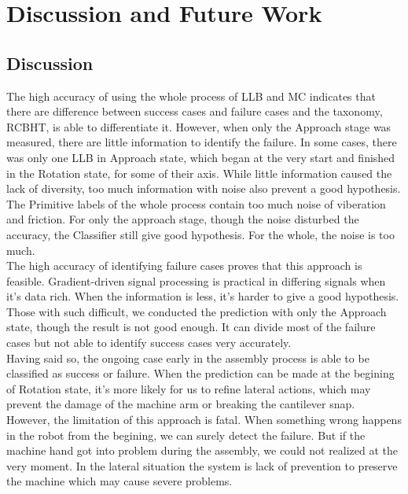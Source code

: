 \chapter{Discussion and Future Work}
\section{Discussion}
The high accuracy of using the whole process of LLB and MC indicates that there are difference between success cases and failure cases and the taxonomy, RCBHT, is able to differentiate it. However, when only the Approach stage was measured, there are little information to identify the failure. In some cases, there was only one LLB in Approach state, which began at the very start and finished in the Rotation state, for some of their axis. While little information caused the lack of diversity, too much information with noise also prevent a good hypothesis. The Primitive labels of the whole process contain too much noise of viberation and friction. For only the approach stage, though the noise disturbed the accuracy, the Classifier still give good hypothesis. For the whole, the noise is too much. \\
\indent The high accuracy of identifying failure cases proves that this approach is feasible. Gradient-driven signal processing is practical in differing signals when it's data rich. When the information is less, it's harder to give a good hypothesis. Those with such difficult, we conducted the prediction with only the Approach state, though the result is not good enough. It can divide most of the failure cases but not able to identify success cases very accurately. \\
\indent Having said so, the ongoing case early in the assembly process is able to be classified as success or failure. When the prediction can be made at the begining of Rotation state, it's more likely for us to refine lateral actions, which may prevent the damage of the machine arm or breaking the cantilever snap. \\ 
\indent However, the limitation of this approach is fatal. When something wrong happens in the robot from the begining, we can surely detect the failure. But if the machine hand got into problem during the assembly, we could not realized at the very moment. In the lateral situation the system is lack of prevention to preserve the machine which may cause severe problems. \\

